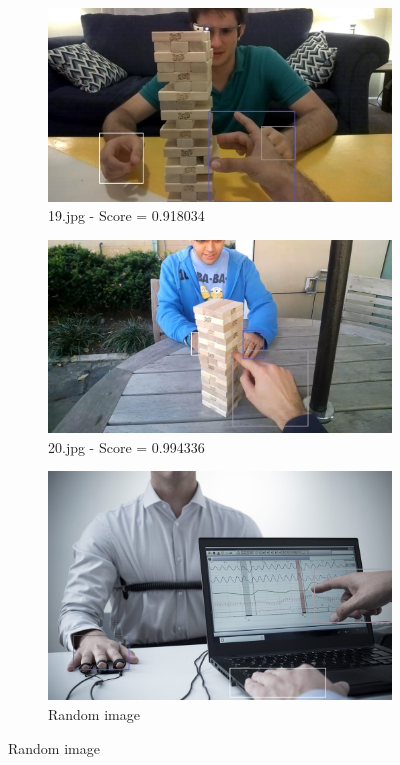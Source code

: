 


\begin{figure}
    \centering
    \begin{subfigure}[b]{0.3 \textwidth}
        \centering
        \includegraphics[width=\textwidth]{images/handDetection/19.jpg}
        \caption{19.jpg - Score = 0.918034}
        
    \end{subfigure}
    \hfill
    \begin{subfigure}[b]{0.3\textwidth}
        \centering
        \includegraphics[width=\textwidth]{images/handDetection/20.jpg}
        \caption{20.jpg - Score = 0.994336}
        
    \end{subfigure}
    \begin{subfigure}[b]{0.3\textwidth}
        \centering
        \includegraphics[width=\textwidth]{images/handDetection/test.jpg}
        \caption{Random image}
        

\end{subfigure}
\end{figure}
